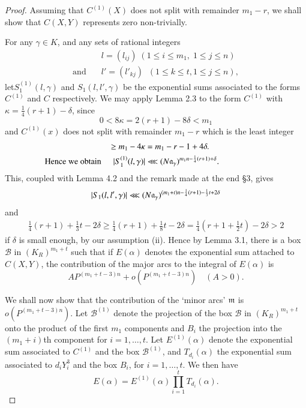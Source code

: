 \begin{proof}
Assuming that $C^{(1)} (X)$ does not split with remainder $m_1 - r$, we shall show that $C(X,Y)$ represents zero non-trivially.

For any $\gamma \in K$, and any sets of rational integers
\begin{align*}
& l = (l_{ij}) \; (1 \leq i \leq m_1, \; 1 \leq j \leq n)\\
\text{and}\quad & l' =(l'_{kj}) \;\; (1 \leq k \leq t, 1 \leq j \leq n),
\end{align*}
let\pageoriginale $S^{(1)}_1 (l, \gamma)$ and $S_1 (l, l',\gamma)$ be the exponential sums associated to the forms $C^{(1)}$ and $C$ respectively. We may apply Lemma 2.3 to the form $C^{(1)}$ with $\kappa = \frac{1}{4} (r+1) - \delta$, since 
$$
0 < 8 \kappa = 2 (r+1) - 8 \delta < m_1
$$
and $C^{(1)}(x)$ does not split with remainder $m_1-r$ which is the least integer
\begin{gather*}
\quad \geq m_1 -4 \kappa = m_1 - r - 1+ 4 \delta.\\
\text{Hence we obtain} \hspace{0.5cm} |S^{(1)}_1 (l, \gamma)| \lll (N\mathfrak{a}_\gamma)^{m_1 n - \frac{1}{4} (r+1) + \delta}. \hspace{2cm}
\end{gather*}
This, coupled with Lemma 4.2 and the remark made at the end \S 3, gives
\begin{gather*}
|S_1 (l,l', \gamma)| \lll (N\mathfrak{a}_\gamma)^{(m_1 + t) n - \frac{1}{4} (r+1)-\frac{1}{3} t + 2 \delta}
\end{gather*}
and 
\begin{gather*}
\frac{1}{4} (r+1) + \frac{1}{3} t -2 \delta \geq \frac{1}{4} (r+1) + \frac{1}{8} t - 2 \delta = \frac{1}{4} (r+1+\frac{1}{2}t) - 2 \delta > 2
\end{gather*}
if $\delta$ is small enough, by our assumption (ii). Hence by Lemma 3.1, there is a box $\mathscr{B}$ in $(K_R)^{m_1 + t}$ such that if $E(\alpha)$ denotes the exponential sum attached to $C(X,Y)$, the contribution of the major arcs to the integral of $E (\alpha)$ is
$$
AP^{(m_1 +  t - 3)n} + o (P^{(m_1+t -3)n})\quad (A>0).
$$

We shall now show that the contribution of the `minor arcs' $\mathfrak{m}$ is $o(P^{(m_1 + t -3)n})$. Let $\mathscr{B}^{(1)}$ denote the projection of the box $\mathscr{B}$ in $(K_R)^{m_1 + t}$ onto the product of the first $m_1$ components and $B_i$ the projection into the $(m_1+i)$th component for $i=1,\ldots, t$. Let $E^{(1)} (\alpha)$ denote the exponential sum associated to $C^{(1)}$ and the box $\mathscr{B}^{(1)}$, and $T_{d_i} (\alpha)$ the exponential sum associated to $d_i Y^3_i$ and the box $B_i$, for $i=1,\ldots,t$. We then have
$$
E(\alpha) = E^{(1)} (\alpha) \prod\limits^t_{i=1} T_{d_i} (\alpha).
$$


\end{proof}
